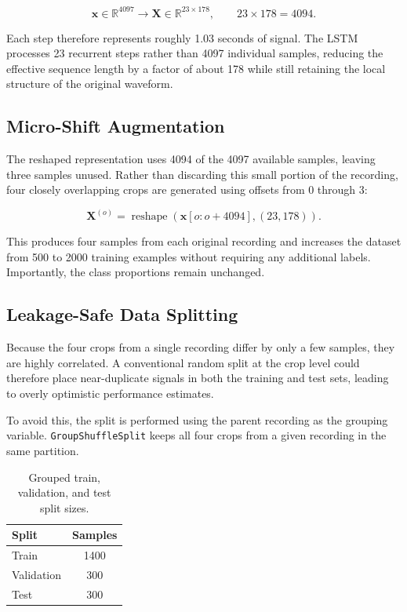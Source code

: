 \documentclass[11pt,a4paper]{article}
\begin{document}
\begin{equation}
\mathbf{x} \in \mathbb{R}^{4097}
\longrightarrow
\mathbf{X} \in \mathbb{R}^{23 \times 178},
\qquad
23 \times 178 = 4094.
\end{equation}

Each step therefore represents roughly 1.03 seconds of signal. The LSTM processes 23 recurrent steps rather than 4097 individual samples, reducing the effective sequence length by a factor of about 178 while still retaining the local structure of the original waveform.

\subsection{Micro-Shift Augmentation}

The reshaped representation uses 4094 of the 4097 available samples, leaving three samples unused. Rather than discarding this small portion of the recording, four closely overlapping crops are generated using offsets from 0 through 3:

\begin{equation}
\mathbf{X}^{(o)}
=
\operatorname{reshape}
\left(
\mathbf{x}[o:o+4094],
(23,178)
\right).
\end{equation}

This produces four samples from each original recording and increases the dataset from 500 to 2000 training examples without requiring any additional labels. Importantly, the class proportions remain unchanged.

\subsection{Leakage-Safe Data Splitting}

Because the four crops from a single recording differ by only a few samples, they are highly correlated. A conventional random split at the crop level could therefore place near-duplicate signals in both the training and test sets, leading to overly optimistic performance estimates.

To avoid this, the split is performed using the parent recording as the grouping variable. \texttt{GroupShuffleSplit} keeps all four crops from a given recording in the same partition.

\begin{table}[H]
\centering
\begin{tabular}{@{}lc@{}}
\toprule
\textbf{Split} & \textbf{Samples} \\
\midrule
Train & 1400 \\
Validation & 300 \\
Test & 300 \\
\bottomrule
\end{tabular}
\caption{Grouped train, validation, and test split sizes.}
\end{table}
\end{document}
